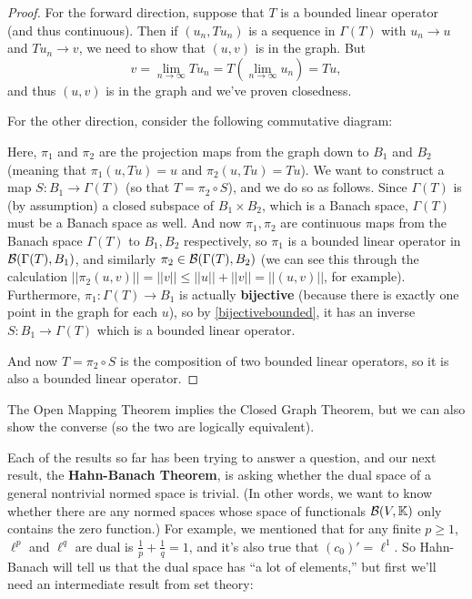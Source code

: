 \begin{proof}
For the forward direction, suppose that $T$ is a bounded linear operator (and thus continuous). Then if $(u_n, Tu_n)$ is a sequence in $\Gamma(T)$ with $u_n \to u$ and $Tu_n \to v$, we need to show that $(u, v)$ is in the graph. But 
\[
    v = \lim_{n \to \infty} Tu_n = T\left(\lim_{n \to \infty} u_n\right) = Tu,
\]
and thus $(u, v)$ is in the graph and we've proven closedness.

For the other direction, consider the following commutative diagram:
\begin{center}
\end{center}

Here, $\pi_1$ and $\pi_2$ are the projection maps from the graph down to $B_1$ and $B_2$ (meaning that $\pi_1(u, Tu) = u$ and $\pi_2(u, Tu) = Tu$). We want to construct a map $S: B_1 \to \Gamma(T)$ (so that $T = \pi_2 \circ S$), and we do so as follows. Since $\Gamma(T)$ is (by assumption) a closed subspace of $B_1 \times B_2$, which is a Banach space, $\Gamma(T)$ must be a Banach space as well. And now $\pi_1, \pi_2$ are continuous maps from the Banach space $\Gamma(T)$ to $B_1, B_2$ respectively, so $\pi_1$ is a bounded linear operator in $\mathcal{B}(\Gamma(T), B_1)$, and similarly $\pi_2 \in \mathcal{B}(\Gamma(T), B_2)$ (we can see this through the calculation $||\pi_2(u, v)|| = ||v|| \le ||u|| + ||v|| = ||(u, v)||$, for example). Furthermore, $\pi_1: \Gamma(T) \to B_1$ is actually \textbf{bijective} (because there is exactly one point in the graph for each $u$), so by \cref{bijectivebounded}, it has an inverse $S: B_1 \to \Gamma(T)$ which is a bounded linear operator.

And now $T = \pi_2 \circ S$ is the composition of two bounded linear operators, so it is also a bounded linear operator.
\end{proof}

\begin{remark}
The Open Mapping Theorem implies the Closed Graph Theorem, but we can also show the converse (so the two are logically equivalent).
\end{remark}

Each of the results so far has been trying to answer a question, and our next result, the \textbf{Hahn-Banach Theorem}, is asking whether the dual space of a general nontrivial normed space is trivial. (In other words, we want to know whether there are any normed spaces whose space of functionals $\mathcal{B}(V, \mathbb K)$ only contains the zero function.) For example, we mentioned that for any finite $p \ge 1$, $\ell^p$ and $\ell^q$ are dual is $\frac{1}{p} + \frac{1}{q} = 1$, and it's also true that $(c_0)' = \ell^1$. So Hahn-Banach will tell us that the dual space has ``a lot of elements,'' but first we'll need an intermediate result from set theory:


